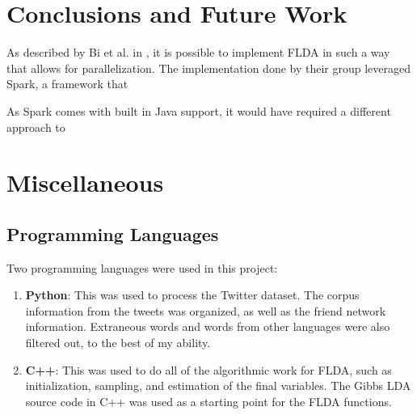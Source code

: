 \documentclass[a4paper]{article}
\begin{document}
\section{Conclusions and Future Work}
\label{sec:conc}

As described by Bi et al. in \cite{flda}, it is possible to implement FLDA in such a way that allows for parallelization. The implementation done by their group leveraged Spark, a framework that 

As Spark comes with built in Java support, it would have required a different approach to 

\section{Miscellaneous}
\label{sec:misc}
\subsection{Programming Languages}
Two programming languages were used in this project:
\begin{enumerate}
\item \textbf{Python}: This was used to process the Twitter dataset. The corpus information from the tweets was organized, as well as the friend network information. Extraneous words and words from other languages were also filtered out, to the best of my ability.
\item \textbf{C++}: This was used to do all of the algorithmic work for FLDA, such as initialization, sampling, and estimation of the final variables. The Gibbs LDA source code in C++ was used as a starting point for the FLDA functions.
\end{enumerate}

\end{document}
